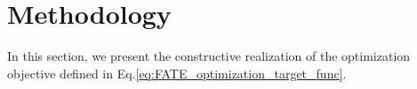 \documentclass{article}
\theoremstyle{plain}
\newtheorem{proposition}[theorem]{Proposition}
\theoremstyle{definition}
\theoremstyle{remark}
\begin{document}





\section{Methodology}
\label{sec:methodology}
In this section, we present the constructive realization of the optimization objective defined in Eq.\eqref{eq:FATE_optimization_target_func}. 

\end{document}
